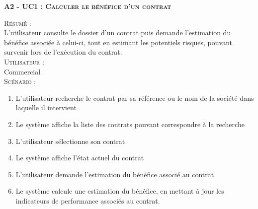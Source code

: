 \noindent\textsc{\bf{A2 - UC1 :} Calculer le bénéfice d’un contrat}
\begin{shaded}
\noindent\textsc{Résumé :}\\

L’utilisateur consulte le dossier d’un contrat puis demande l’estimation du bénéfice associée à celui-ci, tout en estimant les potentiels risques, pouvant survenir lors de l’exécution du contrat. \\

\noindent\textsc{Utilisateur :} \\

Commercial \\

\noindent\textsc{Scénario :} \\
\begin{enumerate}
    \item L’utilisateur recherche le contrat par sa référence ou le nom de la société dans laquelle il intervient
    \item Le système affiche la liste des contrats pouvant correspondre à la recherche
    \item L’utilisateur sélectionne son contrat
    \item Le système affiche l’état actuel du contrat
    \item L’utilisateur demande l’estimation du bénéfice associé au contrat
    \item Le système calcule une estimation du bénéfice, en mettant à jour les indicateurs de performance associés au contrat.
\end{enumerate}
\end{shaded}

